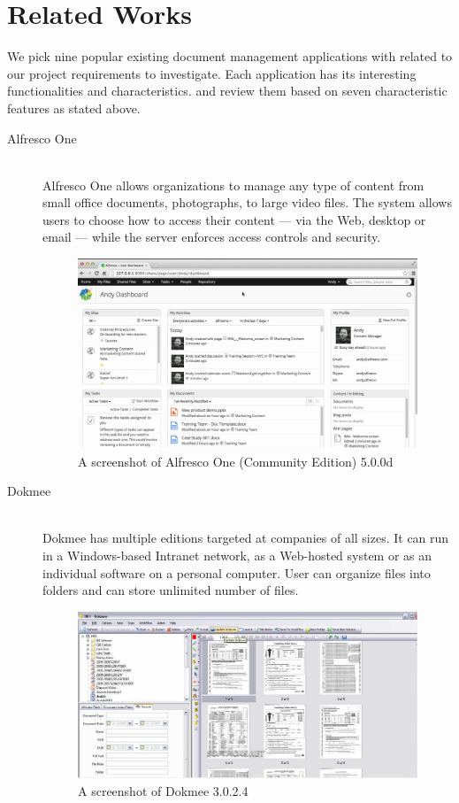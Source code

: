 \section{Related Works} \label{relate-works}
We pick nine popular existing document management applications with related to our project requirements to investigate.
Each application has its interesting functionalities and characteristics.
and review them based on seven characteristic features as stated above.

\begin{description}
\item[Alfresco One] \hfill \\
Alfresco One allows organizations to manage any type of content from small office documents, photographs, to large video files.
The system allows users to choose how to access their content --- via the Web, desktop or email --- while the server enforces access controls and security.
\begin{figure}[h]
	\centering
	\includegraphics[scale=0.4]{res/literature/screenshot_alfresco}
	\caption{A screenshot of Alfresco One (Community Edition) 5.0.0d \cite{alfresco}}
\end{figure}

\item[Dokmee] \hfill \\
Dokmee has multiple editions targeted at companies of all sizes.
It can run in a Windows-based Intranet network, as a Web-hosted system or as an individual software on a personal computer.
User can organize files into folders and can store unlimited number of files.
\begin{figure}[ht]
	\centering
	\includegraphics[scale=0.55]{res/literature/screenshot_dokmee}
	\caption{A screenshot of Dokmee 3.0.2.4 \cite{dokmee}}
\end{figure}


\end{description}
